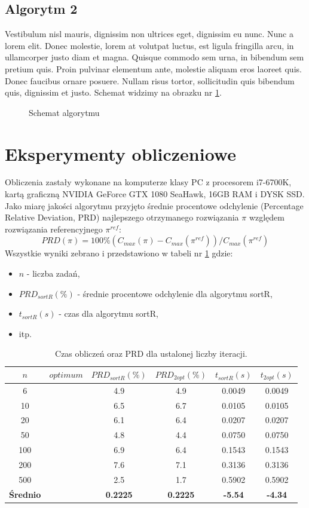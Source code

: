 \documentclass[polish,polish,a4paper]{article}
\begin{document}
\subsection{Algorytm 2}
Vestibulum nisl mauris, dignissim non ultrices eget, dignissim eu nunc. Nunc a lorem elit. Donec molestie, lorem at volutpat luctus, est ligula fringilla arcu, in ullamcorper justo diam et magna. Quisque commodo sem urna, in bibendum sem pretium quis. Proin pulvinar elementum ante, molestie aliquam eros laoreet quis. Donec faucibus ornare posuere. Nullam risus tortor, sollicitudin quis bibendum quis, dignissim et justo. Schemat widzimy na obrazku nr \ref{fig::sa}.
\begin{figure}
\centering

\label{fig::sa}
\caption{Schemat algorytmu}
\end{figure}
\section{Eksperymenty obliczeniowe}
Obliczenia zastały wykonane na komputerze klasy PC z procesorem i7-6700K, kartą graficzną NVIDIA GeForce GTX 1080 SeaHawk, 16GB RAM i DYSK SSD. Jako miarę jakości algorytmu przyjęto średnie procentowe odchylenie (Percentage Relative Deviation, PRD) najlepszego otrzymanego rozwiązania $\pi$ względem rozwiązania referencyjnego $\pi^{ref}$:
\begin{equation}
PRD(\pi)=100\%(C_{max}(\pi)-C_{max}(\pi^{ref}))/C_{max}(\pi^{ref})
\end{equation}
Wszystkie wyniki zebrano i przedstawiono w tabeli nr \ref{tab:result} gdzie:
\begin{itemize}
\item $n$ - liczba zadań,
\item $PRD_{sortR}(\%)$ - średnie procentowe odchylenie dla algorytmu sortR,
\item $t_{sortR}(s)$ - czas dla algorytmu sortR,
\item itp.
\end{itemize}
\begin{table}[h!]
\centering
	\caption{Czas obliczeń oraz PRD dla ustalonej liczby iteracji.}
	\label{tab:result}
	{\begin{tabular}{cccccc}
		\hline
		$n$ &$optimum$&$PRD_{sortR}(\%)$ & $PRD_{2opt}(\%)$& $t_{sortR}(s)$& $t_{2opt}(s)$ \\
		\hline
        6   & & 4.9 & 4.9& 0.0049 & 0.0049 \\
		10  & & 6.5 & 6.7& 0.0105 & 0.0105 \\
		20  & & 6.1 & 6.4& 0.0207 & 0.0207 \\
		50  & & 4.8 & 4.4& 0.0750 & 0.0750 \\
		100 & & 6.9 & 6.4& 0.1543 & 0.1543 \\
		200 & & 7.6 & 7.1& 0.3136 & 0.3136 \\
		500 & & 2.5 & 1.7& 0.5902 & 0.5902 \\
		\hline
		\bf{Średnio}& & \bf{0.2225}& \bf{0.2225}& \bf{-5.54}& \bf{-4.34} \\
		\hline
	\end{tabular}}
	\end{table}
\end{document}
